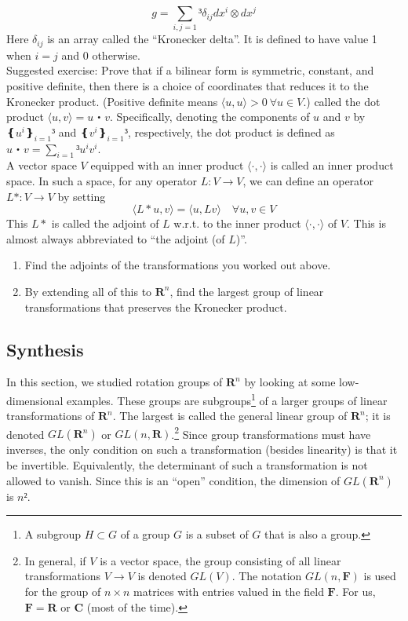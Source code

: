 \begin{enumerate}
{$$
g = \sum_{i,j=1}³ \delta_{ij} dx^i ⊗ dx^j
$$
Here $\delta_{ij}$ is an array called the “Kronecker delta”. It is defined to have value 1 when $i=j$ and 0 otherwise. 
\\
Suggested exercise: Prove that if a bilinear form is symmetric, constant, and positive definite, then there is a choice of coordinates that reduces it to the Kronecker product. (Positive definite means $\langle u , u\rangle >0\ ∀ u ∈ V$.)
}
called the dot product $\langle u , v \rangle = u・v$. Specifically, denoting the components of $u$ and $v$ by $❴ u^i ❵_{i=1}³$ and $❴v^i❵_{i=1}³$, respectively, the dot product is defined as $u・v = \sum_{i=1}³ u^i v^i$.
\\
A vector space $V$ equipped with an inner product $\langle \cdot , \cdot \rangle$ is called an inner product space.
In such a space, for any operator $L:V→ V$, we can define an operator $L*:V→ V$ by setting 
$$
\langle L* u , v\rangle = \langle  u , L v\rangle \quad ∀ u, v ∈ V
$$
This $L*$ is called the adjoint of $L$ w.r.t. to the inner product $\langle \cdot , \cdot \rangle$ of $V$. This is almost always abbreviated to “the adjoint (of $L$)”.
	\begin{enumerate}
	\item Find the adjoints of the transformations you worked out above.
	\item By extending all of this to $𝐑^n$, find the largest group of linear transformations that preserves the Kronecker product.
	\end{enumerate}
\end{enumerate}

\subsection{Synthesis} 
In this section, we studied rotation groups of $𝐑^n$ by looking at some low-dimensional examples. These groups are subgroups\footnote{A subgroup $H⊂G$ of a group $G$ is a subset of $G$ that is also a group.} of a larger groups of linear transformations of $𝐑^n$. The largest is called the general linear group of $𝐑^n$; it is denoted $GL(𝐑^n)$ or $GL(n,𝐑)$.\footnote{In general, if $V$ is a vector space, the group consisting of all linear transformations $V→ V$ is denoted $GL(V)$. The notation $GL(n,𝐅)$ is used for the group of $n× n$ matrices with entries valued in the field $𝐅$. For us, $𝐅=𝐑$ or $𝐂$ (most of the time).} Since group transformations must have inverses, the only condition on such a transformation (besides linearity) is that it be invertible. Equivalently, the determinant of such a transformation is not allowed to vanish. Since this is an “open” condition, the dimension of $GL(𝐑^n)$ is $n²$. 

